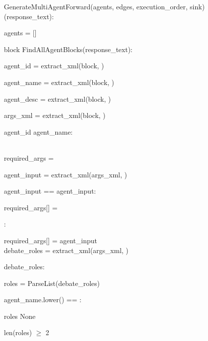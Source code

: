 \begin{subagent}[title=High DoM Parser]
\quad {}

\quad {} GenerateMultiAgentForward(agents, edges, execution\_order, sink) \\



 (response\_text):

\quad agents = []

\quad {}

\quad {} block  FindAllAgentBlocks(response\_text):

\quad\quad agent\_id = extract\_xml(block, )

\quad\quad agent\_name = extract\_xml(block, )

\quad\quad agent\_desc = extract\_xml(block, )

\quad\quad args\_xml = extract\_xml(block, )

\quad\quad {}  agent\_id   agent\_name:

\quad\quad\quad {} \\

\quad\quad required\_args = \code{\{\}}

\quad\quad agent\_input = extract\_xml(args\_xml, )

\quad\quad {} agent\_input ==    agent\_input:

\quad\quad\quad required\_args[] = 

\quad\quad {}:

\quad\quad\quad required\_args[] = agent\_input \\

\quad\quad debate\_roles = extract\_xml(args\_xml, )

\quad\quad {} debate\_roles:

\quad\quad\quad roles = ParseList(debate\_roles)

\quad\quad\quad {} agent\_name.lower() == :

\quad\quad\quad\quad {} roles   None

\quad\quad\quad\quad {} len(roles) $\geq$ 2


\end{subagent}
